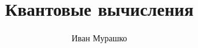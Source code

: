 
\title{Квантовые вычисления}
\author{Иван Мурашко}
\date{}

\Russian

\makeatletter
\renewcommand{\ps@plain}{%
\renewcommand\@oddhead{\hfil\normalfont\textrm{\thepage}\hfil}%
\renewcommand\@evenhead{\hfil\normalfont\textrm{\thepage}\hfil}%
\renewcommand\@oddfoot{}%
\renewcommand\@evenfoot{}%
}

\pagestyle{plain}%


\maketitle

\tableofcontents









